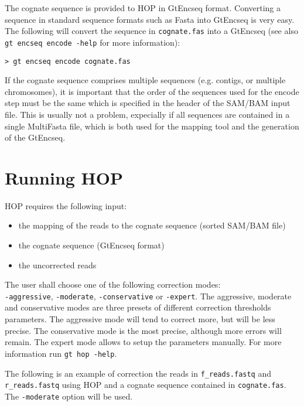 \documentclass[12pt,titlepage]{article}
\newcommand{\Hop}{{HOP}\xspace}
\begin{document}
The cognate sequence is provided to \Hop in GtEncseq format. Converting
a sequence in standard sequence formats such as Fasta into GtEncseq is very
easy. The following will convert the sequence in \texttt{cognate.fas}
into a GtEncseq (see also \texttt{gt encseq encode -help} for more information):

\begin{footnotesize}
\begin{verbatim}
> gt encseq encode cognate.fas
\end{verbatim}
\end{footnotesize}

If the cognate sequence comprises multiple sequences (e.g. contigs,
or multiple chromosomes), it is important that the order of the sequences
used for the encode step must be the same which is specified in the header
of the SAM/BAM input file. This is usually not a problem, expecially
if all sequences are contained in a single MultiFasta file,
which is both used for the mapping tool and the generation of the GtEncseq.

\section{Running \Hop}

\Hop requires the following input:
\begin{itemize}
\item the mapping of the reads to the cognate sequence (sorted SAM/BAM file)
\item the cognate sequence (GtEncseq format)
\item the uncorrected reads
\end{itemize}

The user shall choose one of the following correction modes:\\
\texttt{-aggressive},
\texttt{-moderate},
\texttt{-conservative} or
\texttt{-expert}.
The aggressive, moderate and conservative modes are three presets
of different correction thresholds parameters. The aggressive mode
will tend to correct more, but will be less precise. The conservative
mode is the most precise, although more errors will remain.
The expert mode allows to setup the parameters manually. For more
information run \texttt{gt hop -help}.

The following is an example of correction the reads in
\texttt{f\_reads.fastq} and \texttt{r\_reads.fastq} using \Hop
and a cognate sequence contained in \texttt{cognate.fas}.
The \texttt{-moderate} option will be used.
\end{document}
